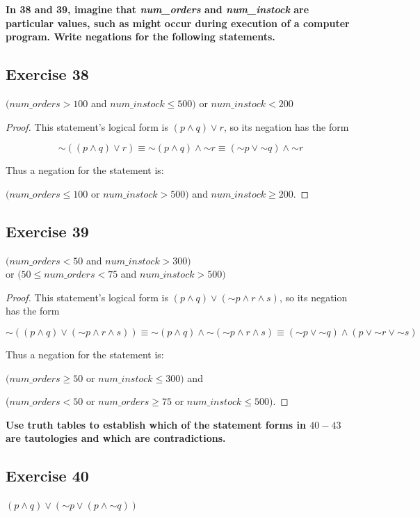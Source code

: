 \documentclass[14pt]{extarticle}
\begin{document}
{\bf In 38 and 39, imagine that {\it num\_orders} and {\it num\_instock} are particular values, such as might occur during execution of a computer program. Write negations for the following statements.}

\subsection{Exercise 38} 
$(num\_orders > 100$ and $num\_instock \leq 500)$ or
$num\_instock < 200$

\begin{proof} 
This statement’s logical form is $(p \wedge q) \vee r$, so its negation has the form

$$ 
{\sim((p \wedge q) \vee r)} \equiv {\sim (p \wedge q)} \wedge {\sim r} \equiv ({\sim p} \vee {\sim q}) \wedge {\sim r} 
$$

Thus a negation for the statement is:

$(num\_orders \leq 100$ or $num\_instock > 500)$ and $num\_instock \geq 200$.
\end{proof}

\subsection{Exercise 39} 
$(num\_orders < 50$ and $num\_instock > 300)$ \\ 
or $(50 \leq num\_orders < 75$ and $num\_instock > 500)$

\begin{proof} 
This statement’s logical form is $(p \wedge q) \vee ({\sim p}
\wedge r \wedge s)$, so its negation has the form

$$ 
{\sim((p \wedge q) \vee ({\sim p} \wedge r \wedge s))} \equiv {\sim(p \wedge q)} \wedge {\sim({\sim p} \wedge r \wedge s)} \equiv ({\sim p} \vee {\sim q}) \wedge (p \vee {\sim r} \vee {\sim s}) 
$$

Thus a negation for the statement is:

$(num\_orders \geq 50$ or $num\_instock \leq 300)$ and

($num\_orders < 50$ or $num\_orders \geq 75$ or $num\_instock \leq 500$).
\end{proof}

{\bf Use truth tables to establish which of the statement forms in $40-43$ are tautologies and which are contradictions.}

\subsection{Exercise 40} 
$(p \wedge q) \vee ({\sim p} \vee (p \wedge {\sim q}))$
\end{document}
